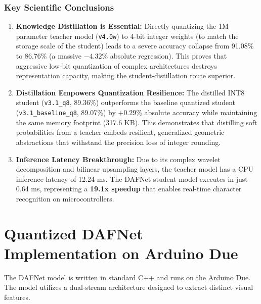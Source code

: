 \documentclass[12pt,a4paper]{article}
\begin{document}
\subsubsection{Key Scientific Conclusions}
\begin{enumerate}
    \item \textbf{Knowledge Distillation is Essential:} Directly quantizing the 1M parameter teacher model (\texttt{v4.0w}) to 4-bit integer weights (to match the storage scale of the student) leads to a severe accuracy collapse from 91.08\% to 86.76\% (a massive $-4.32\%$ absolute regression). This proves that aggressive low-bit quantization of complex architectures destroys representation capacity, making the student-distillation route superior.
    \item \textbf{Distillation Empowers Quantization Resilience:} The distilled INT8 student (\texttt{v3.1\_q8}, 89.36\%) outperforms the baseline quantized student (\texttt{v3.1\_baseline\_q8}, 89.07\%) by $+0.29\%$ absolute accuracy while maintaining the same memory footprint (317.6 KB). This demonstrates that distilling soft probabilities from a teacher embeds resilient, generalized geometric abstractions that withstand the precision loss of integer rounding.
    \item \textbf{Inference Latency Breakthrough:} Due to its complex wavelet decomposition and bilinear upsampling layers, the teacher model has a CPU inference latency of 12.24 ms. The DAFNet student model executes in just 0.64 ms, representing a \textbf{19.1x speedup} that enables real-time character recognition on microcontrollers.
\end{enumerate}

\section{Quantized DAFNet Implementation on Arduino Due}
The DAFNet model is written in standard C++ and runs on the Arduino Due. The model utilizes a dual-stream architecture designed to extract distinct visual features.
\end{document}
